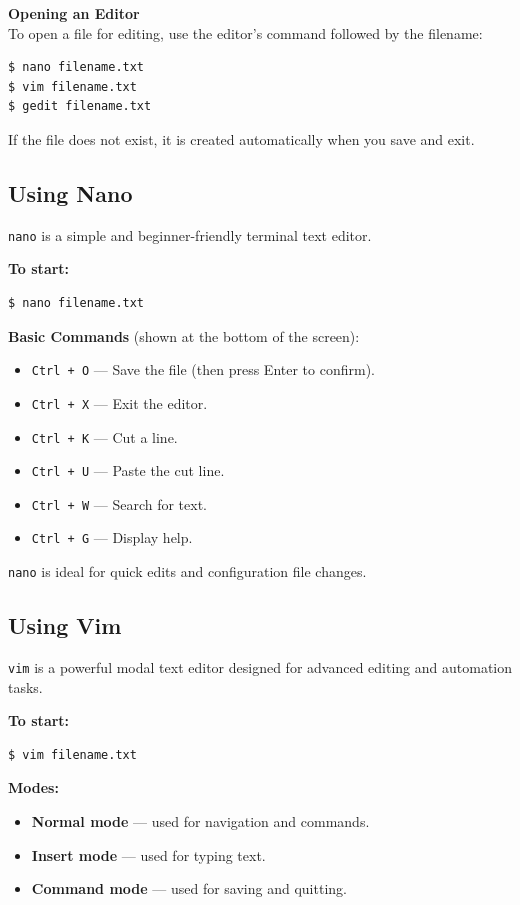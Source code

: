 \textbf{Opening an Editor}\\
To open a file for editing, use the editor's command followed by the filename:
\begin{lstlisting}[language=Terminal]
$ nano filename.txt
$ vim filename.txt
$ gedit filename.txt
\end{lstlisting}
If the file does not exist, it is created automatically when you save and exit.

\subsection{Using Nano}
\texttt{nano} is a simple and beginner-friendly terminal text editor.

\textbf{To start:}
\begin{lstlisting}[language=Terminal]
$ nano filename.txt
\end{lstlisting}

\textbf{Basic Commands} (shown at the bottom of the screen):
\begin{itemize}
    \item \texttt{Ctrl + O} --- Save the file (then press Enter to confirm).
    \item \texttt{Ctrl + X} --- Exit the editor.
    \item \texttt{Ctrl + K} --- Cut a line.
    \item \texttt{Ctrl + U} --- Paste the cut line.
    \item \texttt{Ctrl + W} --- Search for text.
    \item \texttt{Ctrl + G} --- Display help.
\end{itemize}
\texttt{nano} is ideal for quick edits and configuration file changes.

\subsection{Using Vim}
\texttt{vim} is a powerful modal text editor designed for advanced editing and automation tasks.

\textbf{To start:}
\begin{lstlisting}[language=Terminal]
$ vim filename.txt
\end{lstlisting}

\textbf{Modes:}
\begin{itemize}
    \item \textbf{Normal mode} --- used for navigation and commands.
    \item \textbf{Insert mode} --- used for typing text.
    \item \textbf{Command mode} --- used for saving and quitting.
\end{itemize}

